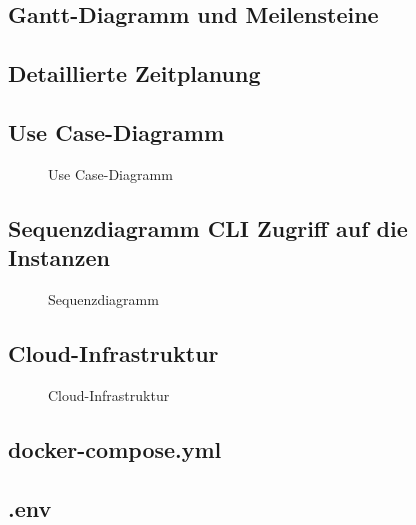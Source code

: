 \subsection{Gantt-Diagramm und Meilensteine}
\label{app:Gantt}
\clearpage

\subsection{Detaillierte Zeitplanung}
\clearpage

\subsection{Use Case-Diagramm}
\label{app:UseCase}
\begin{figure}[htb]
  \centering
  \caption{Use Case-Diagramm}
\end{figure}
\clearpage

\subsection{Sequenzdiagramm CLI Zugriff auf die Instanzen}
\label{app:Sequenzdiagramm CLI Zugriff auf die Instanzen}
\begin{figure}[htb]
  \centering
  \caption{Sequenzdiagramm}
\end{figure}
\clearpage

\subsection{Cloud-Infrastruktur}
\label{app:Cloud-Infrastruktur}
\begin{figure}[htb]
    \centering
    \caption{Cloud-Infrastruktur}
\end{figure}
\pagebreak

\subsection{docker-compose.yml}
\label{app:docker-compose.yml}

\subsection{.env}
\label{app:dotenv}
\clearpage

